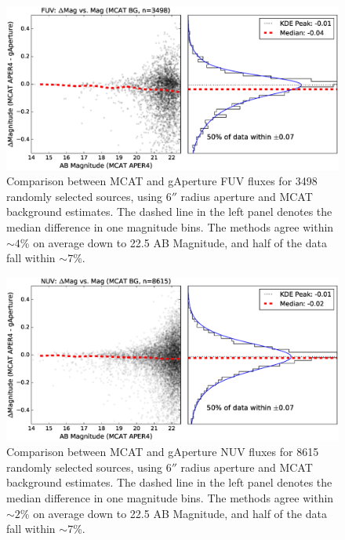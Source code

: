 \documentclass[preprint]{aastex}
\begin{document}
\begin{figure}
\includegraphics[scale=0.64]{Fig07.eps}
\caption{Comparison between MCAT and gAperture FUV fluxes for 3498 randomly selected sources, using $6''$ radius aperture and MCAT background estimates. The dashed line in the left panel denotes the median difference in one magnitude bins. The methods agree within $\sim 4$\% on average down to 22.5 AB Magnitude, and half of the data fall within $\sim 7$\%.
\label{fuvrelphotmcat}}
\end{figure}


\begin{figure}
\includegraphics[scale=0.64]{Fig08.eps}
\caption{Comparison between MCAT and gAperture NUV fluxes for 8615 randomly selected sources, using $6''$ radius aperture and MCAT background estimates. The dashed line in the left panel denotes the median difference in one magnitude bins. The methods agree within $\sim 2$\% on average down to 22.5 AB Magnitude, and half of the data fall within $\sim 7$\%.
\label{nuvrelphotmcat}}
\end{figure}
\end{document}
